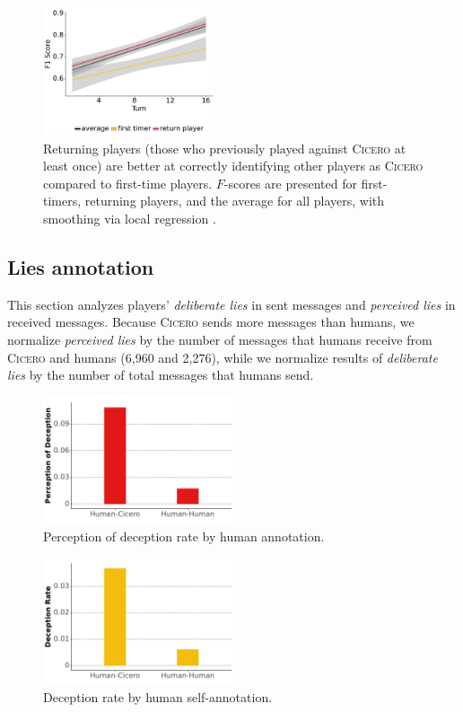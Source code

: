 \documentclass[oneside]{memoir}
\newcommand{\cicero}{\abr{Cicero} }
\newcommand{\abr}[1]{\textsc{#1}}
\begin{document}
\begin{figure}[h]
\centering
\includegraphics[width=0.45\textwidth]{figures/f1_by_phase.pdf}
\caption{Returning players (those who previously played against \cicero{} at least once) are better at correctly identifying other players as \cicero{} compared to first-time players. $F$-scores are presented for first-timers, returning players, and the average for all players, with smoothing via local regression \citep{doi:10.1080/01621459.1979.10481038}.}
\label{fig:image1}
\end{figure}

\subsection{Lies annotation}
\label{sec:result_human_lie}

This section analyzes players' \textit{deliberate lies} in sent messages and \textit{perceived lies} in received messages.
%
Because \cicero{} sends more messages than humans, we normalize \textit{perceived lies} by the number of messages that humans receive from \cicero{} and humans (6,960 and 2,276), while we normalize results of \textit{deliberate lies} by the number of total messages that humans send.

\begin{figure}[t]
    \centering
    \includegraphics[width=0.5\textwidth]{figures/perceived_lies.pdf}
    \caption{Perception of deception rate by human annotation.}
    \label{fig:perceived_lies}
\end{figure}
\begin{figure}[t]
    \centering
    \includegraphics[width=0.5\textwidth]{figures/human_lies.pdf}
    \caption{Deception rate by human self-annotation.}
    \label{fig:human_lies}
\end{figure}
\end{document}
